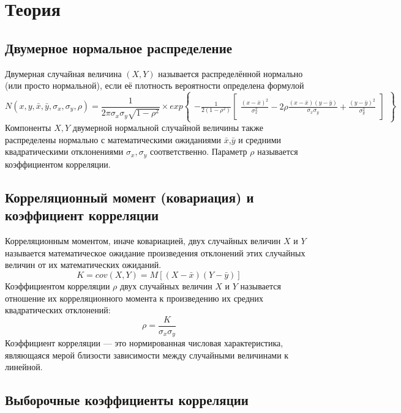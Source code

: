 \documentclass[a4paper]{article}
\begin{document}
\section{Теория}
\subsection{Двумерное нормальное распределение}
\noindent Двумерная случайная величина $(X,Y)$ называется распределённой нормально (или просто нормальной), если её плотность вероятности определена формулой
\begin{equation}
N(x, y, \bar{x}, \bar{y}, \sigma_{x}, \sigma_{y}, \rho) = 
\frac{1}{2\pi\sigma_{x}\sigma_{y}\sqrt{1-\rho^{2}}} \times
exp{\begin{Bmatrix}
	-\frac{1}{2(1-\rho^{2})}
	\begin{bmatrix}
	\frac{(x-\bar{x})^{2}}{\sigma_{x}^{2}} - 2\rho\frac{(x-\bar{x})(y-\bar{y})}{\sigma_{x}\sigma_{y}} + \frac{(y-\bar{y})^{2}}{\sigma_{y}^{2}}
	\end{bmatrix}
	\end{Bmatrix}}
\end{equation}
Компоненты $X,Y$ двумерной нормальной случайной величины также распределены нормально с математическими ожиданиями $\bar{x}$,$\bar{y}$ и средними квадратическими отклонениями $\sigma_{x},\sigma_{y}$ соответственно.
Параметр $\rho$ называется коэффициентом корреляции.


\subsection{Корреляционный момент (ковариация) и коэффициент корреляции}
\noindent Корреляционным моментом, иначе ковариацией, двух случайных величин $X$ и $Y$ называется математическое ожидание произведения отклонений этих случайных величин от их математических ожиданий.
\begin{equation}
K = cov(X, Y) = M[(X - \bar{x})(Y - \bar{y})]
\label{K}
\end{equation}
Коэффициентом корреляции $\rho$ двух случайных величин $X$ и $Y$ называется отношение их корреляционного момента к произведению их средних квадратических отклонений:
\begin{equation}
\rho = \frac{K}{\sigma_{x}\sigma_{y}}
\label{ro}
\end{equation}
Коэффициент корреляции — это нормированная числовая характеристика, являющаяся мерой близости зависимости между случайными величинами к линейной.

\subsection{Выборочные коэффициенты корреляции}
\end{document}
